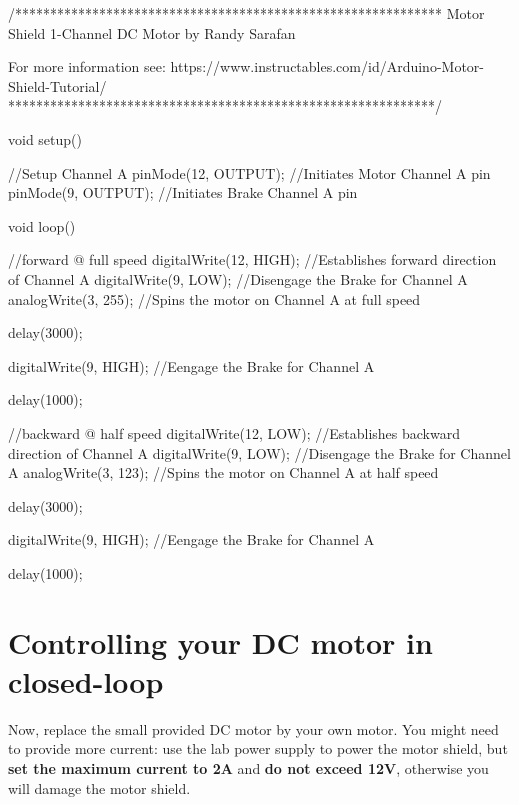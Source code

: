 \documentclass{instructions}
\begin{document}
\begin{cppcode}
/*************************************************************
Motor Shield 1-Channel DC Motor
by Randy Sarafan

For more information see:
https://www.instructables.com/id/Arduino-Motor-Shield-Tutorial/
*************************************************************/

void setup() {
  
  //Setup Channel A
  pinMode(12, OUTPUT); //Initiates Motor Channel A pin
  pinMode(9, OUTPUT); //Initiates Brake Channel A pin
  
}

void loop(){
  
  //forward @ full speed
  digitalWrite(12, HIGH); //Establishes forward direction of Channel A
  digitalWrite(9, LOW);   //Disengage the Brake for Channel A
  analogWrite(3, 255);   //Spins the motor on Channel A at full speed
  
  delay(3000);
  
  digitalWrite(9, HIGH); //Eengage the Brake for Channel A

  delay(1000);
  
  //backward @ half speed
  digitalWrite(12, LOW); //Establishes backward direction of Channel A
  digitalWrite(9, LOW);   //Disengage the Brake for Channel A
  analogWrite(3, 123);   //Spins the motor on Channel A at half speed
  
  delay(3000);
  
  digitalWrite(9, HIGH); //Eengage the Brake for Channel A
  
  delay(1000);
  
}
\end{cppcode}


\part{Controlling your DC motor in closed-loop}



Now, replace the small provided DC motor by your own motor. You might need to
provide more current: use the lab power supply to power the motor shield, but
\textbf{set the maximum current to 2A} and \textbf{do not exceed 12V}, otherwise
you will damage the motor shield.
\end{document}
